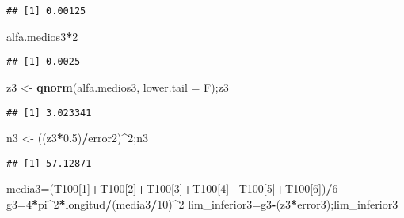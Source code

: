 \documentclass[
]{article}
\newenvironment{Shaded}{\begin{snugshade}}{\end{snugshade}}
\newcommand{\AttributeTok}[1]{\textcolor[rgb]{0.13,0.29,0.53}{#1}}
\newcommand{\DecValTok}[1]{\textcolor[rgb]{0.00,0.00,0.81}{#1}}
\newcommand{\FloatTok}[1]{\textcolor[rgb]{0.00,0.00,0.81}{#1}}
\newcommand{\FunctionTok}[1]{\textcolor[rgb]{0.13,0.29,0.53}{\textbf{#1}}}
\newcommand{\NormalTok}[1]{#1}
\newcommand{\OtherTok}[1]{\textcolor[rgb]{0.56,0.35,0.01}{#1}}
\newcommand{\SpecialCharTok}[1]{\textcolor[rgb]{0.81,0.36,0.00}{\textbf{#1}}}
\begin{document}
\begin{verbatim}
## [1] 0.00125
\end{verbatim}

\begin{Shaded}
\begin{Highlighting}[]
\NormalTok{alfa.medios3}\SpecialCharTok{*}\DecValTok{2}
\end{Highlighting}
\end{Shaded}

\begin{verbatim}
## [1] 0.0025
\end{verbatim}

\begin{Shaded}
\begin{Highlighting}[]
\NormalTok{z3 }\OtherTok{\textless{}{-}} \FunctionTok{qnorm}\NormalTok{(alfa.medios3, }\AttributeTok{lower.tail =}\NormalTok{ F);z3}
\end{Highlighting}
\end{Shaded}

\begin{verbatim}
## [1] 3.023341
\end{verbatim}

\begin{Shaded}
\begin{Highlighting}[]
\NormalTok{n3 }\OtherTok{\textless{}{-}}\NormalTok{ ((z3}\SpecialCharTok{*}\FloatTok{0.5}\NormalTok{)}\SpecialCharTok{/}\NormalTok{error2)}\SpecialCharTok{\^{}}\DecValTok{2}\NormalTok{;n3}
\end{Highlighting}
\end{Shaded}

\begin{verbatim}
## [1] 57.12871
\end{verbatim}

\begin{Shaded}
\begin{Highlighting}[]
\NormalTok{media3}\OtherTok{=}\NormalTok{(T100[}\DecValTok{1}\NormalTok{]}\SpecialCharTok{+}\NormalTok{T100[}\DecValTok{2}\NormalTok{]}\SpecialCharTok{+}\NormalTok{T100[}\DecValTok{3}\NormalTok{]}\SpecialCharTok{+}\NormalTok{T100[}\DecValTok{4}\NormalTok{]}\SpecialCharTok{+}\NormalTok{T100[}\DecValTok{5}\NormalTok{]}\SpecialCharTok{+}\NormalTok{T100[}\DecValTok{6}\NormalTok{])}\SpecialCharTok{/}\DecValTok{6}
\NormalTok{g3}\OtherTok{=}\DecValTok{4}\SpecialCharTok{*}\NormalTok{pi}\SpecialCharTok{\^{}}\DecValTok{2}\SpecialCharTok{*}\NormalTok{longitud}\SpecialCharTok{/}\NormalTok{(media3}\SpecialCharTok{/}\DecValTok{10}\NormalTok{)}\SpecialCharTok{\^{}}\DecValTok{2}
\NormalTok{lim\_inferior3}\OtherTok{=}\NormalTok{g3}\SpecialCharTok{{-}}\NormalTok{(z3}\SpecialCharTok{*}\NormalTok{error3);lim\_inferior3}
\end{Highlighting}
\end{Shaded}
\end{document}
